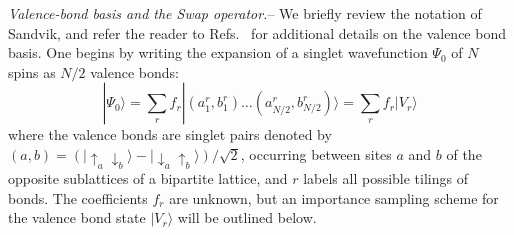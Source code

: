 \documentclass[prl,aps,twocolumn,floatfix,amsmath,amssymb,superscriptaddress,tightenlines]{revtex4}
\begin{document}
{\it Valence-bond basis and the Swap operator.}-- We briefly review the notation of Sandvik, and refer the reader to 
Refs.~\cite{Sandvik,Beach,AWSloop} for additional details on the valence bond basis.
One begins by writing the expansion of a singlet
wavefunction $\Psi_0$ of $N$ spins as $N/2$ valence bonds:
\begin{equation}
| \Psi_0 \rangle = \sum_r f_r|(a^r_1,b^r_1) \ldots (a^r_{N/2},b^r_{N/2}) \rangle = \sum_r f_r| V_r \rangle
\end{equation}
where the valence bonds are singlet pairs denoted by $(a,b) = (\lvert\uparrow_a \downarrow_b \rangle - \lvert\downarrow_a \uparrow_b\rangle)/\sqrt{2}$,
occurring between sites $a$ and $b$ of the opposite sublattices of a bipartite lattice, and $r$ labels all possible tilings of bonds.  The coefficients $f_r$ are unknown, but an importance sampling scheme \cite{Sandvik} for the valence bond state $| V_r \rangle$ will be outlined below.  
\end{document}
